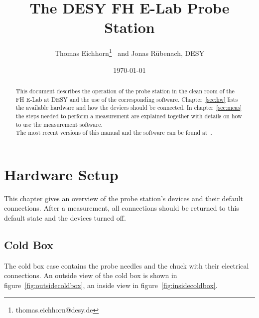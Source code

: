 \documentclass[a4paper]{article}
\begin{document}
\author{Thomas Eichhorn\footnote{thomas.eichhorn@desy.de}~ and Jonas R\"ubenach, DESY}
\date{\today}
\title{The DESY FH E-Lab Probe Station}
\maketitle
\begin{abstract}
This document describes the operation of the probe station in the clean room of the FH E-Lab at DESY and the use of the corresponding software.
Chapter~\ref{sec:hw} lists the available hardware and how the devices should be connected.
In chapter~\ref{sec:meas} the steps needed to perform a measurement are explained together with details on how to use the measurement software.\\ \newline
The most recent versions of this manual and the software can be found at~\cite{ref:github}.
\end{abstract}

\tableofcontents

\newpage
\section{Hardware Setup}
\label{sec:hw}

This chapter gives an overview of the probe station's devices and their default connections.
After a measurement, all connections should be returned to this default state and the devices turned off.\\

\subsection{Cold Box}
\label{sec:coldbox}

The cold box case contains the probe needles and the chuck with their electrical connections.
An outside view of the cold box is shown in figure~\ref{fig:outsidecoldbox}, an inside view in figure~\ref{fig:insidecoldbox}.\\
\end{document}
